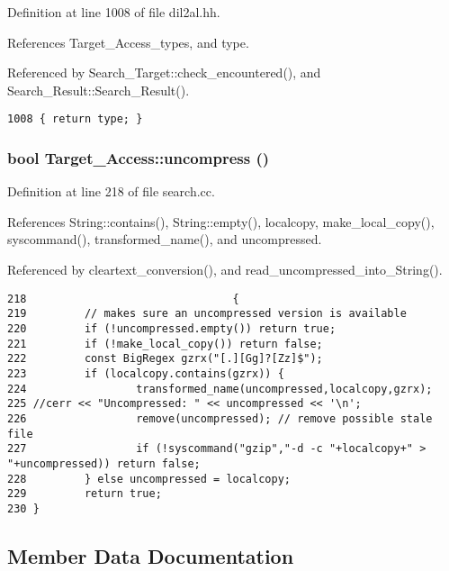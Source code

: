 Definition at line 1008 of file dil2al.hh.

References Target\_\-Access\_\-types, and type.

Referenced by Search\_\-Target::check\_\-encountered(), and Search\_\-Result::Search\_\-Result().



\footnotesize\begin{verbatim}1008 { return type; }
\end{verbatim}\normalsize 
{}
\subsubsection{\setlength{\rightskip}{0pt plus 5cm}bool Target\_\-Access::uncompress ()}\label{classTarget__Access_a7}




Definition at line 218 of file search.cc.

References String::contains(), String::empty(), localcopy, make\_\-local\_\-copy(), syscommand(), transformed\_\-name(), and uncompressed.

Referenced by cleartext\_\-conversion(), and read\_\-uncompressed\_\-into\_\-String().



\footnotesize\begin{verbatim}218                                {
219         // makes sure an uncompressed version is available
220         if (!uncompressed.empty()) return true;
221         if (!make_local_copy()) return false;
222         const BigRegex gzrx("[.][Gg]?[Zz]$");
223         if (localcopy.contains(gzrx)) {
224                 transformed_name(uncompressed,localcopy,gzrx);
225 //cerr << "Uncompressed: " << uncompressed << '\n';
226                 remove(uncompressed); // remove possible stale file
227                 if (!syscommand("gzip","-d -c "+localcopy+" > "+uncompressed)) return false;
228         } else uncompressed = localcopy;
229         return true;
230 }
\end{verbatim}\normalsize 


\subsection{Member Data Documentation}
